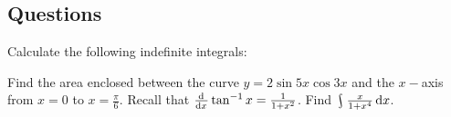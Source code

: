 \subsection*{Questions}
\begin{questions}
  \question Calculate the following indefinite integrals:
  \question Find the area enclosed between the curve $ y = 2 \sin 5x \cos 3x $ and the $ x-$axis from $ x = 0 $ to $ x = \frac{\pi}{6} $.
  \question Recall that $ \od{}{x} \tan^{-1} x = \frac{1}{1 + x^2} $. Find $ \rint \frac{x}{1 + x^4} \dif{x} $.
\end{questions}

